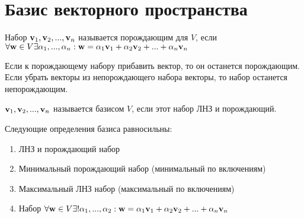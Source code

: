 \documentclass[main]{subfiles}
\begin{document}
\chapter[Базис \texorpdfstring{$V$}{V}]{Базис векторного пространства}
\begin{definition}
    Набор $\mathbf{v}_1, \mathbf{v}_2, ..., \mathbf{v}_n$ называется порождающим для $V$,
    если $\forall \mathbf{w} \in V \exists \alpha_1,..., \alpha_n : \mathbf{w} =
        \alpha_1 \mathbf{v}_1 + \alpha_2 \mathbf{v}_2 + ... + \alpha_n \mathbf{v}_n$
\end{definition}
\begin{prop}
    Если к порождающему набору прибавить вектор, то он останется порождающим.
    Если убрать векторы из непорождающего набора векторы, то набор останется непорождающим.
\end{prop}

\begin{definition}
    $\mathbf{v}_1, \mathbf{v}_2, ..., \mathbf{v}_n$ называется базисом $V$, если этот набор ЛНЗ и порождающий.
\end{definition}
\begin{theorem}[О базисе]
    Следующие определения базиса равносильны:
    \begin{enumerate}
        \item ЛНЗ и  порождающий набор
        \item Минимальный порождающий набор (минимальный по включениям)
        \item Максимальный ЛНЗ набор (максимальный по включениям)
        \item Набор $\forall \mathbf{w} \in V \exists! \alpha_1, ..., \alpha_2:
                  \mathbf{w} = \alpha_1 \mathbf{v}_1 + \alpha_2 \mathbf{v}_2 + ... + \alpha_n \mathbf{v}_n$
    \end{enumerate}
\end{theorem}
\end{document}
